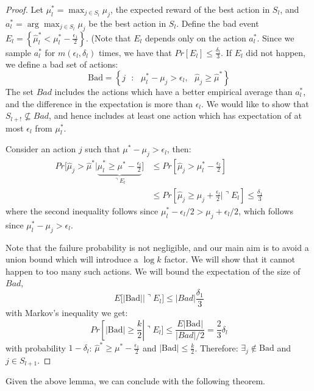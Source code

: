 \begin{proof}
Let $\mu^*_l=\max_{j\in S_l} \mu_j$, the expected reward of the best action in $S_l$, and $a^*_l=\arg\max_{j\in S_l} \mu_j$ be the best action in $S_l$.
Define the bad event $E_{l}=\left\{\hat{\mu}^{*}_l<\mu^{*}_l-\frac{\epsilon_{1}}{2}\right\}$. (Note that $E_l$ depends only on the action $a^*_l$. Since we sample $a^*_l$ for $m(\epsilon_l,\delta_l)$ times, we have that $Pr\left[E_{l}\right]\le\frac{\delta_{l}}{3}$. If $E_{l}$ did not happen, we define a bad set of actions:
\[
\text{Bad}=\left\{ j\text{ }:\text{ }\mu^{*}_l-\mu_{j}>\epsilon_{l},\text{ }\hat{\mu}_{j}\ge\hat{\mu}^{*}\right\}
\]
The set $Bad$ includes the actions which have a better empirical average than $a_l^*$, and the difference in the expectation is more than $\epsilon_l$. We would like to show that $S_{l+!}\not\subseteq Bad$, and hence includes at least one action which has expectation of at most $\epsilon_l$ from $\mu^*_l$.


Consider an action $j$ such that $\mu^*-\mu_j > \epsilon_l$, then:
\begin{align*}
Pr[\hat{\mu}_{j}>
\hat{\mu}^{*}|\underbrace{\hat{\mu}^{*}_l\ge\mu^{*}-\frac{\epsilon_{l}}{2}}_{\urcorner
E_{l}}\big] & \le Pr[\hat{\mu}_{j}> \mu^{*}_l-\frac{\epsilon_{l}}{2}]\\
&\leq 
Pr[\hat{\mu}_{j}\ge\mu_{j}+\frac{\epsilon_{l}}{2}|\urcorner E_{l}]
\le  \frac{\delta_{1}}{3}
\end{align*}
where the second inequality follows since $\mu^*_l-\epsilon_l/2 > \mu_j+\epsilon_l/2$, which follows since $\mu^*_l-\mu_j>\epsilon_l$.



Note that the failure probability is not negligible, and our main aim is to avoid a union bound which will introduce a $\log k$ factor. We will show that it cannot happen to too many such actions. We will bound the expectation of the size of $Bad$,
\[
E[|\text{Bad}||\urcorner E_{l}]\le |Bad|\frac{\delta_{1}}{3}
\]
 with Markov's inequality we get:
\[
Pr\left[\left|\text{Bad}\right|\ge\frac{k}{2}\right|\urcorner E_{l}]
 \le  \frac{E\left|\text{Bad}\right|}{|Bad|/2}
  =  \frac{2}{3}\delta_{l}
\]
 with probability $1-\delta_{l}$: $\hat{\mu}^{*}\ge\mu^{*}-\frac{\epsilon_{1}}{2}$ and $\left|\text{Bad}\right|\le\frac{k}{2}$. Therefore: $\exists_{j}\notin\text{Bad}$ and $j\in S_{l+1}$.
\end{proof}

Given the above lemma, we can conclude with the following theorem.

